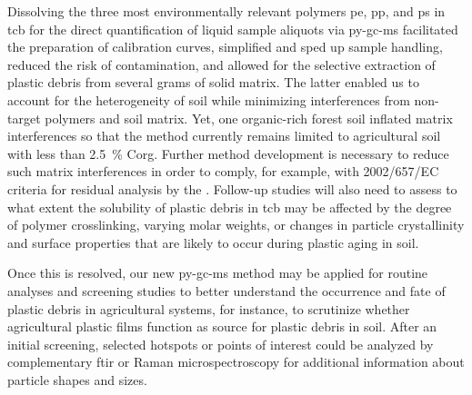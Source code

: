 Dissolving the three most environmentally relevant polymers \ac{pe}, \ac{pp}, and \ac{ps} in \ac{tcb} for the direct quantification of liquid sample aliquots via \ac{py-gc-ms} facilitated the preparation of calibration curves, simplified and sped up sample handling, reduced the risk of contamination, and allowed for the selective extraction of plastic debris from several grams of solid matrix.
The latter enabled us to account for the heterogeneity of soil while minimizing interferences from non-target polymers and soil matrix. Yet, one organic-rich forest soil inflated matrix interferences so that the method currently remains limited to agricultural soil with less than \SI{2.5}{\percent} \ac{Corg}. Further method development is necessary to reduce such matrix interferences in order to comply, for example, with 2002/657/EC criteria for residual analysis by the \citet{EuropeanCommissionCommission2002}. Follow-up studies will also need to assess to what extent the solubility of plastic debris in \ac{tcb} may be affected by the degree of polymer crosslinking, varying molar weights, or changes in particle crystallinity and surface properties that are likely to occur during plastic aging in soil.

Once this is resolved, our new \ac{py-gc-ms} method may be applied for routine analyses and screening studies to better understand the occurrence and fate of plastic debris in agricultural systems, for instance, to scrutinize whether agricultural plastic films function as source for plastic debris in soil. After an initial screening, selected hotspots or points of interest could be analyzed by complementary \ac{ftir} or Raman microspectroscopy for additional information about particle shapes and sizes.
